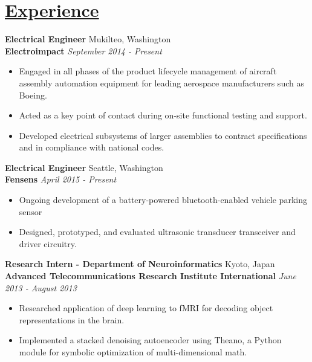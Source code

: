 \documentclass[a4paper, 11pt]{article}
\begin{document}
\section{\underline{Experience}}
  \textbf{Electrical Engineer}
  \hfill
  Mukilteo, Washington \\
  \textbf{Electroimpact}
  \hfill
  \emph{September 2014 - Present}
  \begin{itemize}[nosep]
    \item Engaged in all phases of the product lifecycle management of aircraft assembly automation equipment for leading aerospace manufacturers such as Boeing.
    \item Acted as a key point of contact during on-site functional testing and support.
    \item Developed electrical subsystems of larger assemblies to contract specifications and in compliance with national codes.
  \end{itemize}
  \medskip
  
  \textbf{Electrical Engineer}
  \hfill
  Seattle, Washington \\
  \textbf{Fensens}
  \hfill
  \emph{April 2015 - Present}
  \begin{itemize}[nosep]
    \item Ongoing development of a battery-powered bluetooth-enabled vehicle parking sensor
    \item Designed, prototyped, and evaluated ultrasonic transducer transceiver and driver circuitry.
  \end{itemize}
  \medskip
  
  \textbf{Research Intern - Department of Neuroinformatics}
  \hfill
  Kyoto, Japan \\
  \textbf{Advanced Telecommunications Research Institute International}
  \hfill
  \emph{June 2013 - August 2013}
  \begin{itemize}[nosep]
    \item Researched application of deep learning to fMRI for decoding object representations in the brain.
    \item Implemented a stacked denoising autoencoder using Theano, a Python module for symbolic optimization of multi-dimensional math.
  \end{itemize}
  \medskip
  
\end{document}

